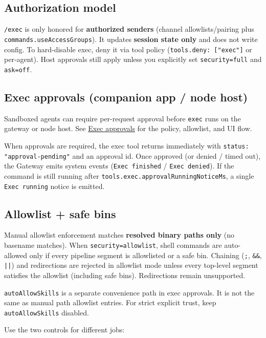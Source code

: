\subsection{Authorization model}


\texttt{/exec} is only honored for \textbf{authorized senders} (channel allowlists/pairing plus \texttt{commands.useAccessGroups}).
It updates \textbf{session state only} and does not write config. To hard-disable exec, deny it via tool
policy (\texttt{tools.deny: ["exec"]} or per-agent). Host approvals still apply unless you explicitly set
\texttt{security=full} and \texttt{ask=off}.

\subsection{Exec approvals (companion app / node host)}


Sandboxed agents can require per-request approval before \texttt{exec} runs on the gateway or node host.
See \href{/tools/exec-approvals}{Exec approvals} for the policy, allowlist, and UI flow.

When approvals are required, the exec tool returns immediately with
\texttt{status: "approval-pending"} and an approval id. Once approved (or denied / timed out),
the Gateway emits system events (\texttt{Exec finished} / \texttt{Exec denied}). If the command is still
running after \texttt{tools.exec.approvalRunningNoticeMs}, a single \texttt{Exec running} notice is emitted.

\subsection{Allowlist + safe bins}


Manual allowlist enforcement matches \textbf{resolved binary paths only} (no basename matches). When
\texttt{security=allowlist}, shell commands are auto-allowed only if every pipeline segment is
allowlisted or a safe bin. Chaining (\texttt{;}, \texttt{\&\&}, \texttt{||}) and redirections are rejected in
allowlist mode unless every top-level segment satisfies the allowlist (including safe bins).
Redirections remain unsupported.

\texttt{autoAllowSkills} is a separate convenience path in exec approvals. It is not the same as
manual path allowlist entries. For strict explicit trust, keep \texttt{autoAllowSkills} disabled.

Use the two controls for different jobs:


